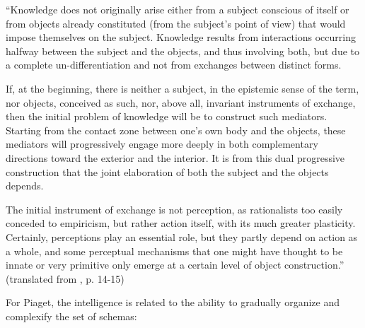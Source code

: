 \documentclass[runningheads]{llncs}
\begin{document}
\begin{adjustwidth}{1cm}{1cm}
``Knowledge does not originally arise either from a subject conscious of itself or from objects already constituted (from the subject's point of view) that would impose themselves on the subject. 
Knowledge results from interactions occurring halfway between the subject and the objects, and thus involving both, but due to a complete un-differentiation and not from exchanges between distinct forms.

If, at the beginning, there is neither a subject, in the epistemic sense of the term, nor objects, conceived as such, nor, above all, invariant instruments of exchange, then the initial problem of knowledge will be to construct such mediators. 
Starting from the contact zone between one's own body and the objects, these mediators will progressively engage more deeply in both complementary directions toward the exterior and the interior. 
It is from this dual progressive construction that the joint elaboration of both the subject and the objects depends.

The initial instrument of exchange is not perception, as rationalists too easily conceded to empiricism, but rather action itself, with its much greater plasticity. 
Certainly, perceptions play an essential role, but they partly depend on action as a whole, and some perceptual mechanisms that one might have thought to be innate or very primitive only emerge at a certain level of object construction.'' (translated from \cite{piaget_lepistemologie_2011}, p. 14-15)
\\

\end{adjustwidth}

For Piaget, the intelligence is related to the ability to gradually organize and complexify the set of schemas: 
\\
\end{document}

